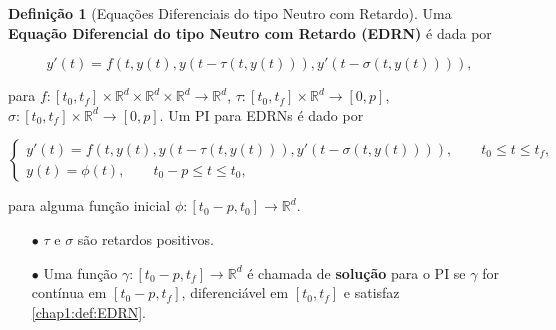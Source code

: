 \documentclass{beamer}
\newcommand{\R}{\mathbb{R}}
\theoremstyle{plain}
\theoremstyle{definition}
\newtheorem{defi}{Definição}
\begin{document}
\begin{frame}
     
    \footnotesize
    \begin{defi}[Equações Diferenciais do tipo Neutro com Retardo]

        Uma \textbf{Equação Diferencial do tipo Neutro com Retardo (EDRN)} é dada por

        \begin{equation}
            y'(t) = f(t, y(t), y(t - \tau(t, y(t))), y'(t - \sigma(t, y(t)))), 
        \end{equation}

        para $f:[t_0, t_f] \times \R^d \times \R^d \times \R^d \to \R^d$,  $\tau: [t_0, t_f] \times \R^d \to [0, p]$, $\sigma: [t_0, t_f] \times \R^d \to [0, p]$. Um PI para EDRNs é dado por 

        \begin{equation}
            \begin{cases}
                y'(t) = f(t, y(t), y(t - \tau(t, y(t))), y'(t - \sigma(t, y(t)))), \qquad t_0 \leq t \leq t_f , \\
                y(t) = \phi(t), \qquad t_0 - p \leq t \leq t_0,
            \end{cases}
            \label{chap1:def:EDRN}
        \end{equation}
        
        para alguma função inicial $\phi:[t_0 - p, t_0] \to \R^d $.

        
        \begin{itemize}
            \item[$\bullet$] $\tau$ e $\sigma$ são retardos positivos.
            \item[$\bullet$] Uma função $\gamma:[t_0 - p, t_f] \to \R^d$ é chamada de \textbf{solução} para o PI se $\gamma$ for contínua em $[t_0 - p, t_f]$, diferenciável em $[t_0, t_f]$ e satisfaz \eqref{chap1:def:EDRN}.
        \end{itemize}

    \end{defi}

\end{frame}

\end{document}
